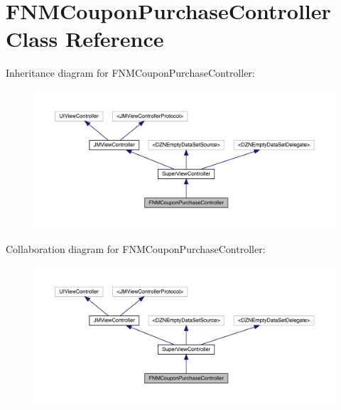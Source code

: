 \hypertarget{interface_f_n_m_coupon_purchase_controller}{}\section{F\+N\+M\+Coupon\+Purchase\+Controller Class Reference}
\label{interface_f_n_m_coupon_purchase_controller}


Inheritance diagram for F\+N\+M\+Coupon\+Purchase\+Controller\+:\nopagebreak
\begin{figure}[H]
\begin{center}
\leavevmode
\includegraphics[width=350pt]{interface_f_n_m_coupon_purchase_controller__inherit__graph}
\end{center}
\end{figure}


Collaboration diagram for F\+N\+M\+Coupon\+Purchase\+Controller\+:\nopagebreak
\begin{figure}[H]
\begin{center}
\leavevmode
\includegraphics[width=350pt]{interface_f_n_m_coupon_purchase_controller__coll__graph}
\end{center}
\end{figure}
